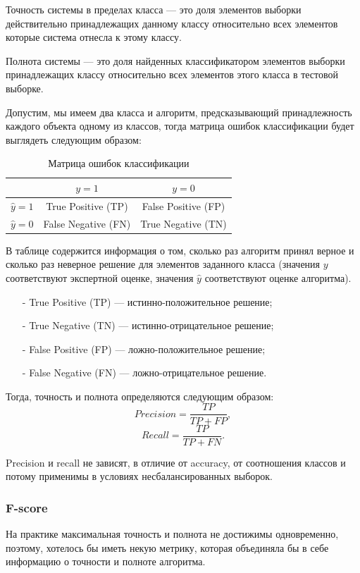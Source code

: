 \documentclass[14pt, a4paper, oneside]{extarticle}
\begin{document}
Точность системы в пределах класса --- это доля элементов выборки действительно принадлежащих данному классу относительно всех элементов которые система отнесла к этому классу.

Полнота системы --- это доля найденных классификатором элементов выборки принадлежащих классу относительно всех элементов этого класса в тестовой выборке.

Допустим, мы имеем два класса и алгоритм, предсказывающий принадлежность каждого объекта одному из классов, тогда матрица ошибок классификации будет выглядеть следующим образом:

\begin{table}[H]
    \centering
    \caption{Матрица ошибок классификации}
    \begin{tabular}{ |c|c|c| }
        \hline
        & $y=1$ & $y=0$ \\
        \hline
        $\hat{y}=1$ & True Positive (TP) & False Positive (FP) \\
        \hline
        $\hat{y}=0$ & False Negative (FN) & True Negative (TN) \\
        \hline
    \end{tabular}
\end{table}

В таблице содержится информация о том, сколько раз алгоритм принял верное и сколько раз неверное решение для элементов заданного класса (значения $y$ соответствуют экспертной оценке, значения $\hat{y}$ соответствуют оценке алгоритма).

\begin{itemize}
    \item[-] True Positive (TP) --- истинно-положительное решение;
    \item[-] True Negative (TN) --- истинно-отрицательное решение;
    \item[-] False Positive (FP) --- ложно-положительное решение;
    \item[-] False Negative (FN) --- ложно-отрицательное решение.
\end{itemize}

Тогда, точность и полнота определяются следующим образом:
$$Precision = \frac{TP}{TP+FP},$$
$$Recall = \frac{TP}{TP+FN}.$$

Precision и recall не зависят, в отличие от accuracy, от соотношения классов и потому применимы в условиях несбалансированных выборок.

\subsubsection{F-score}
На практике максимальная точность и полнота не достижимы одновременно, поэтому, хотелось бы иметь некую метрику, которая объединяла бы в себе информацию о точности и полноте алгоритма.
\end{document}
